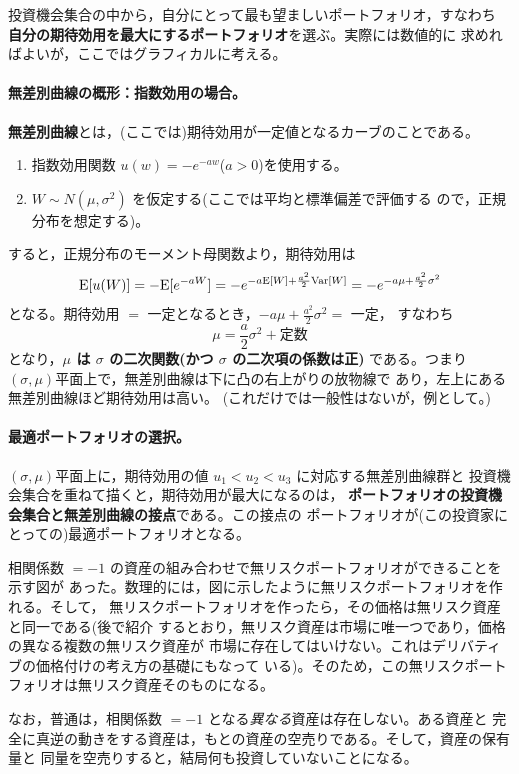 投資機会集合の中から，自分にとって最も望ましいポートフォリオ，すなわち
\textbf{自分の期待効用を最大にするポートフォリオ}を選ぶ。実際には数値的に
求めればよいが，ここではグラフィカルに考える。

\paragraph{無差別曲線の概形：指数効用の場合。}
\textbf{無差別曲線}とは，(ここでは)期待効用が一定値となるカーブのことである。
\begin{enumerate}
\item 指数効用関数 $u(w) = -e^{-aw}$($a>0$)を使用する。
\item $W \sim N(\mu, \sigma^2)$ を仮定する(ここでは平均と標準偏差で評価する
ので，正規分布を想定する)。
\end{enumerate}
すると，正規分布のモーメント母関数より，期待効用は
\begin{equation}
\mathrm{E}[u(W)] = -\mathrm{E}[e^{-aW}] = -e^{-a\mathrm{E}[W] + \frac{a^2}{2}\mathrm{Var}[W]}
= -e^{-a\mu + \frac{a^2}{2}\sigma^2}
\end{equation}
となる。期待効用 $=$ 一定となるとき，$-a\mu + \frac{a^2}{2}\sigma^2 = $ 一定，
すなわち
\[
\mu = \frac{a}{2}\sigma^2 + \text{定数}
\]
となり，\textbf{$\mu$ は $\sigma$ の二次関数(かつ $\sigma$ の二次項の係数は正)}
である。つまり$(\sigma,\mu)$平面上で，無差別曲線は下に凸の右上がりの放物線で
あり，左上にある無差別曲線ほど期待効用は高い。
(これだけでは一般性はないが，例として。)

\paragraph{最適ポートフォリオの選択。}
$(\sigma,\mu)$平面上に，期待効用の値 $u_1 < u_2 < u_3$ に対応する無差別曲線群と
投資機会集合を重ねて描くと，期待効用が最大になるのは，
\textbf{ポートフォリオの投資機会集合と無差別曲線の接点}である。この接点の
ポートフォリオが(この投資家にとっての)最適ポートフォリオとなる。

\begin{remark}[無リスクポートフォリオの存在について]
相関係数 $=-1$ の資産の組み合わせで無リスクポートフォリオができることを示す図が
あった。数理的には，図に示したように無リスクポートフォリオを作れる。そして，
無リスクポートフォリオを作ったら，その価格は無リスク資産と同一である(後で紹介
するとおり，無リスク資産は市場に唯一つであり，価格の異なる複数の無リスク資産が
市場に存在してはいけない。これはデリバティブの価格付けの考え方の基礎にもなって
いる)。そのため，この無リスクポートフォリオは無リスク資産そのものになる。

なお，普通は，相関係数 $=-1$ となる\emph{異なる}資産は存在しない。ある資産と
完全に真逆の動きをする資産は，もとの資産の空売りである。そして，資産の保有量と
同量を空売りすると，結局何も投資していないことになる。
\end{remark}

